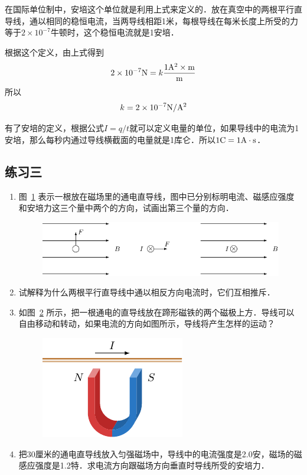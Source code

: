 在国际单位制中，安培这个单位就是利用上式来定义的．放在真空中的两根平行直导线，通以相同的稳恒电流，当两导线相距1米，每根导线在每米长度上所受的力等于$2\times10^{-7}$牛顿时，这个稳恒电流就是1安培．

根据这个定义，由上式得到
\[ 2\times10^{-7} {\rm N}=k\frac{1{\rm A^2}\times {\rm m}}{\rm m}\]
所以
\[k=2\times10^{-7}{{\rm N}/{\rm A^2}}\]

有了安培的定义，根据公式$I=q/t$就可以定义电量的单位，如果导线中的电流为1安培，那么每秒内通过导线横截面的电量就是1库仑．所以$1{\rm C}=1{\rm A}\cdot {\rm s}$．

\subsection*{练习三}
\begin{enumerate}
    \item 图~\ref{fig_C_1-24} 表示一根放在磁场里的通电直导线，图中已分别标明电流、磁感应强度和安培力这三个量中两个的方向，试画出第三个量的方向．
    \begin{figure}[htbp]
        \centering
        \includegraphics{fig/C/1-24.pdf}
        \caption{}\label{fig_C_1-24}
    \end{figure}
    \item 试解释为什么两根平行直导线中通以相反方向电流时，它们互相推斥．
    \item 如图~\ref{fig_C_1-25} 所示，把一根通电的直导线放在蹄形磁铁的两个磁极上方．导线可以自由移动和转动，如果电流的方向如图所示，导线将产生怎样的运动？
    \begin{figure}[htbp]
        \centering
        \includegraphics{fig/C/1-25.pdf}
        \caption{}\label{fig_C_1-25}
    \end{figure}
    \item 把30厘米的通电直导线放入匀强磁场中，导线中的电流强度是2.0安，磁场的磁感应强度是1.2特．求电流方向跟磁场方向垂直时导线所受的安培力．
    

\end{enumerate}
